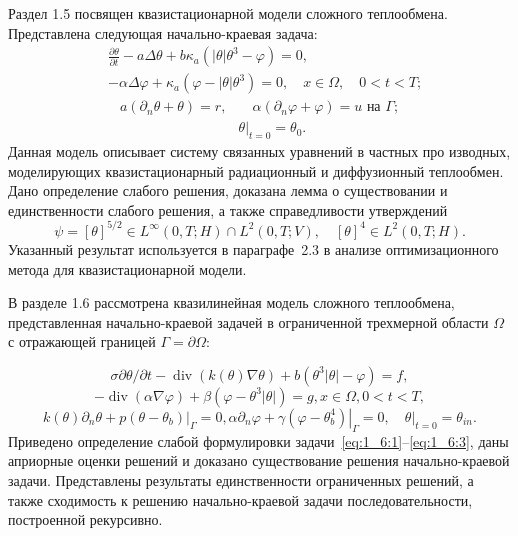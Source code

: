 Раздел 1.5 посвящен квазистационарной модели сложного теплообмена.
Представлена следующая начально-краевая задача:
\begin{equation}
    \label{eq:2_3:1}
    \begin{split}
        & \frac{\partial \theta}{\partial t} - a \Delta \theta
        + b \kappa_{a} \left(|\theta| \theta^{3}-\varphi\right) = 0,\\
        & - \alpha \Delta \varphi
        + \kappa_{a} \left(\varphi-|\theta| \theta^{3}\right) = 0,
        \quad x \in \Omega, \quad 0 < t < T;
    \end{split}
\end{equation}
\begin{align}
    a \left(\partial_{n} \theta+\theta\right)=r,
    & \quad \alpha\left(\partial_{n} \varphi
    + \varphi\right) = u \text { на } \Gamma;  \label{eq:2_3:2}\\
    & \left.\theta\right|_{t=0} = \theta_{0}. \label{eq:2_3:3}
\end{align}
Данная модель описывает систему связанных уравнений в частных про
изводных, моделирующих квазистационарный радиационный и диффузионный
теплообмен.
Дано определение слабого решения, доказана лемма о существовании и единственности
слабого решения, а также справедливости утверждений
\[
    \psi=[\theta]^{5 / 2} \in L^{\infty}(0, T ; H) \cap L^{2}(0, T ; V),
    \quad[\theta]^{4} \in L^{2}(0, T ; H).
\]
Указанный результат используется в параграфе~2.3 в анализе
оптимизационного метода для квазистационарной модели.

В разделе 1.6 рассмотрена квазилинейная модель сложного теплообмена,
представленная начально-краевой задачей в ограниченной трехмерной
области $\Omega$ с отражающей границей $\Gamma=\partial \Omega$:

\begin{equation}
    \label{eq:1_6:1}
    \sigma \partial \theta / \partial t
    -\operatorname{div}(k(\theta) \nabla \theta)
    +b\left(\theta^{3}|\theta|-\varphi\right)=f,
\end{equation}
\begin{equation}
    \label{eq:1_6:2}
    -\operatorname{div}(\alpha \nabla \varphi)
    +\beta\left(\varphi-\theta^{3}|\theta|\right)=g, x \in \Omega, 0<t<T,
\end{equation}
\begin{equation}
    \label{eq:1_6:3}
    k(\theta) \partial_{n} \theta+\left.p\left(\theta-\theta_{b}\right)\right|_{\Gamma}=0,
    \alpha \partial_{n} \varphi
    +\left.\gamma\left(\varphi-\theta_{b}^{4}\right)\right|_{\Gamma}=0,
    \left.\quad \theta\right|_{t=0}=\theta_{in}.
\end{equation}
Приведено определение слабой формулировки задачи~\eqref{eq:1_6:1}--\eqref{eq:1_6:3},
даны априорные оценки решений и доказано существование решения начально-краевой задачи.
Представлены результаты единственности ограниченных решений,
а также сходимость к решению начально-краевой задачи
последовательности, построенной рекурсивно.



